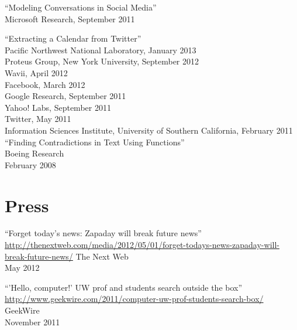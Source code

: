 \documentclass[margin,line]{res}
\begin{document}
\begin{resume}
``Modeling Conversations in Social Media'' \\
Microsoft Research, September 2011

``Extracting a Calendar from Twitter'' \\
Pacific Northwest National Laboratory, January 2013 \\
Proteus Group, New York University, September 2012 \\
Wavii, April 2012 \\
Facebook, March 2012 \\
Google Research, September 2011 \\
Yahoo! Labs, September 2011 \\
Twitter, May 2011 \\
Information Sciences Institute, University of Southern California, February 2011 \\



%
%
``Finding Contradictions in Text Using Functions'' \\
Boeing Research \\
February 2008

\section{\sc Press}
``Forget today's news: Zapaday will break future news''\\
\url{http://thenextweb.com/media/2012/05/01/forget-todays-news-zapaday-will-break-future-news/}
The Next Web \\
May 2012

``'Hello, computer!' UW prof and students search outside the box''\\
\url{http://www.geekwire.com/2011/computer-uw-prof-students-search-box/} \\
GeekWire \\
November 2011


\end{resume}
\end{document}
